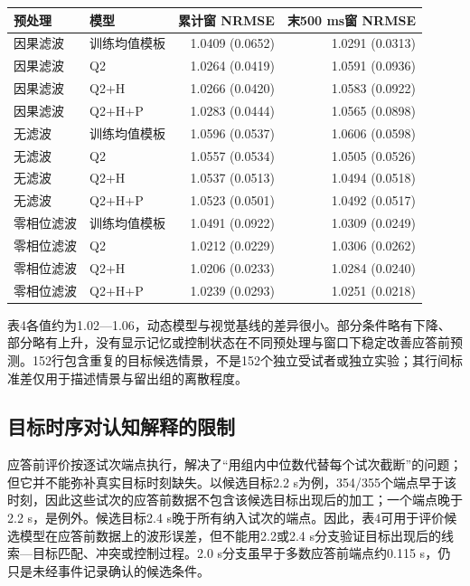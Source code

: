 \documentclass[UTF8,12pt,a4paper,fontset=windows]{ctexart}
\begin{document}
\begin{longtable}[]{@{}llrr@{}}
\toprule
预处理 & 模型 & 累计窗 NRMSE & 末500 ms窗 NRMSE \\
\midrule
\endhead
因果滤波 & 训练均值模板 & 1.0409 (0.0652) & 1.0291 (0.0313) \\
因果滤波 & Q2 & 1.0264 (0.0419) & 1.0591 (0.0936) \\
因果滤波 & Q2+H & 1.0266 (0.0420) & 1.0583 (0.0922) \\
因果滤波 & Q2+H+P & 1.0283 (0.0444) & 1.0565 (0.0898) \\
无滤波 & 训练均值模板 & 1.0596 (0.0537) & 1.0606 (0.0598) \\
无滤波 & Q2 & 1.0557 (0.0534) & 1.0505 (0.0526) \\
无滤波 & Q2+H & 1.0537 (0.0513) & 1.0494 (0.0518) \\
无滤波 & Q2+H+P & 1.0523 (0.0501) & 1.0492 (0.0517) \\
零相位滤波 & 训练均值模板 & 1.0491 (0.0922) & 1.0309 (0.0249) \\
零相位滤波 & Q2 & 1.0212 (0.0229) & 1.0306 (0.0262) \\
零相位滤波 & Q2+H & 1.0206 (0.0233) & 1.0284 (0.0240) \\
零相位滤波 & Q2+H+P & 1.0239 (0.0293) & 1.0251 (0.0218) \\
\bottomrule
\end{longtable}

表4各值约为1.02---1.06，动态模型与视觉基线的差异很小。部分条件略有下降、部分略有上升，没有显示记忆或控制状态在不同预处理与窗口下稳定改善应答前预测。152行包含重复的目标候选情景，不是152个独立受试者或独立实验；其行间标准差仅用于描述情景与留出组的离散程度。

\hypertarget{ux76eeux6807ux65f6ux5e8fux5bf9ux8ba4ux77e5ux89e3ux91caux7684ux9650ux5236}{%
\subsection{目标时序对认知解释的限制}\label{ux76eeux6807ux65f6ux5e8fux5bf9ux8ba4ux77e5ux89e3ux91caux7684ux9650ux5236}}

应答前评价按逐试次端点执行，解决了``用组内中位数代替每个试次截断''的问题；但它并不能弥补真实目标时刻缺失。以候选目标2.2 s为例，354/355个端点早于该时刻，因此这些试次的应答前数据不包含该候选目标出现后的加工；一个端点晚于2.2 s，是例外。候选目标2.4 s晚于所有纳入试次的端点。因此，表4可用于评价候选模型在应答前数据上的波形误差，但不能用2.2或2.4 s分支验证目标出现后的线索---目标匹配、冲突或控制过程。2.0 s分支虽早于多数应答前端点约0.115 s，仍只是未经事件记录确认的候选条件。
\end{document}

